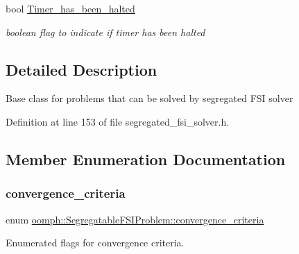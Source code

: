\begin{DoxyCompactItemize}
bool \hyperlink{classoomph_1_1SegregatableFSIProblem_abb20be243e501b04b18da8697ce0985d}{Timer\+\_\+has\+\_\+been\+\_\+halted}
\begin{DoxyCompactList}\small\item\em boolean flag to indicate if timer has been halted \end{DoxyCompactList}\end{DoxyCompactItemize}


\subsection{Detailed Description}
Base class for problems that can be solved by segregated F\+SI solver 

Definition at line 153 of file segregated\+\_\+fsi\+\_\+solver.\+h.



\subsection{Member Enumeration Documentation}
\mbox{\label{classoomph_1_1SegregatableFSIProblem_a06634a6823bb5062d11e97f0be78f373}} 
\subsubsection{\texorpdfstring{convergence\+\_\+criteria}{convergence\_criteria}}
{\footnotesize\ttfamily enum \hyperlink{classoomph_1_1SegregatableFSIProblem_a06634a6823bb5062d11e97f0be78f373}{oomph\+::\+Segregatable\+F\+S\+I\+Problem\+::convergence\+\_\+criteria}}



Enumerated flags for convergence criteria. 

